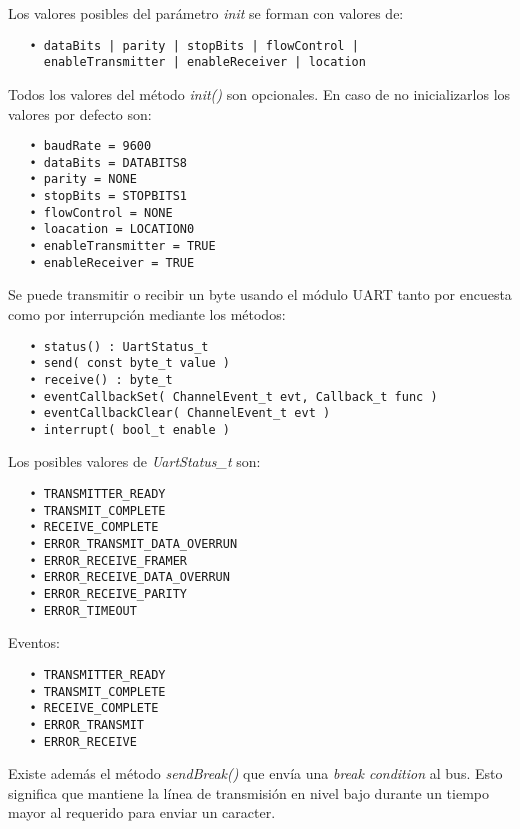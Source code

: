 Los valores posibles del parámetro \emph{init} se forman con valores de:

\begin{verbatim}
   • dataBits | parity | stopBits | flowControl |
     enableTransmitter | enableReceiver | location
\end{verbatim}

Todos los valores del método \emph{init()} son opcionales. En caso de no inicializarlos los valores por defecto son:

\begin{verbatim}
   • baudRate = 9600
   • dataBits = DATABITS8
   • parity = NONE
   • stopBits = STOPBITS1
   • flowControl = NONE
   • loacation = LOCATION0
   • enableTransmitter = TRUE
   • enableReceiver = TRUE
\end{verbatim}

Se puede transmitir o recibir un byte usando el módulo UART tanto por encuesta como por interrupción mediante los métodos:

\begin{verbatim}
   • status() : UartStatus_t
   • send( const byte_t value )
   • receive() : byte_t
   • eventCallbackSet( ChannelEvent_t evt, Callback_t func )
   • eventCallbackClear( ChannelEvent_t evt )
   • interrupt( bool_t enable )
\end{verbatim}
  
Los posibles valores de \emph{UartStatus\_t} son:


\begin{verbatim}
   • TRANSMITTER_READY
   • TRANSMIT_COMPLETE
   • RECEIVE_COMPLETE
   • ERROR_TRANSMIT_DATA_OVERRUN
   • ERROR_RECEIVE_FRAMER
   • ERROR_RECEIVE_DATA_OVERRUN
   • ERROR_RECEIVE_PARITY
   • ERROR_TIMEOUT
\end{verbatim}

Eventos:


\begin{verbatim}
   • TRANSMITTER_READY
   • TRANSMIT_COMPLETE
   • RECEIVE_COMPLETE
   • ERROR_TRANSMIT
   • ERROR_RECEIVE
\end{verbatim}

Existe además el método \emph{sendBreak()} que envía una \emph{break condition} al bus. Esto significa que mantiene la línea de transmisión en nivel bajo durante un tiempo mayor al requerido para enviar un caracter.

